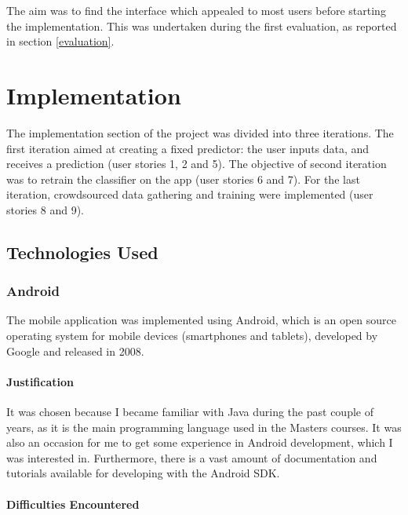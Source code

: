 \documentclass{mproj}
\begin{document}
The aim was to find the interface which appealed to most users before starting the implementation. This was undertaken during the first evaluation, as reported in section \ref{evaluation}.


\chapter{Implementation}\label{implementation}

The implementation section of the project was divided into three iterations. 
The first iteration aimed at creating a fixed predictor: the user inputs data, and receives a prediction (user stories 1, 2 and 5). 
The objective of second iteration was to retrain the classifier on the app (user stories 6 and 7). 
For the last iteration, crowdsourced data gathering and training were implemented (user stories 8 and 9). \par

\section{Technologies Used}

\subsection{Android}

The mobile application was implemented using Android, which is an open source operating system for mobile devices (smartphones and tablets), developed by Google and released in 2008.\cite{androidrelease}

\subsubsection*{Justification}

It was chosen because I became familiar with Java during the past couple of years, as it is the main programming language used in the Masters courses. It was also an occasion for me to get some experience in Android development, which I was interested in. Furthermore, there is a vast amount of documentation and tutorials available for developing with the Android SDK. \cite{androidtutorials} \cite{thebignerdranchguide}

\subsubsection*{Difficulties Encountered}
\end{document}
